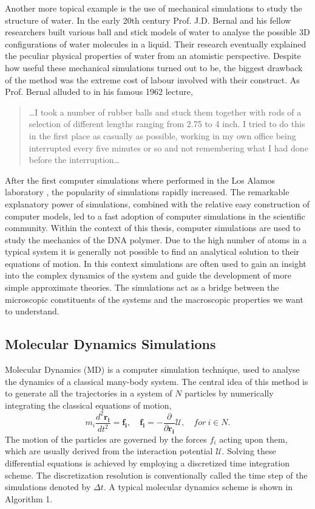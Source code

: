 Another more topical example is the use of mechanical simulations to study the
structure of water.  In the early 20th century Prof. J.D. Bernal and his fellow
researchers built various ball and stick models of water to analyse the possible 3D
configurations of water molecules in a liquid.\cite{Finney_2007} Their research
eventually explained the peculiar physical properties of water from an atomistic
perspective. Despite how useful these mechanical simulations turned out to be, the
biggest drawback of the method was the extreme cost of labour involved with their
construct. As Prof. Bernal alluded to in his famous 1962 lecture,

\begin{quote}
\dots I took a number of rubber balls and stuck them together with rods of a
selection of different lengths ranging from 2.75 to 4 inch. I tried to do this in the
first place as casually as possible, working in my own office being interrupted every
five minutes or so and not remembering what I had done before the interruption\dots
\cite{Bernal1962}
\end{quote}

After the first computer simulations where performed in the Los Alamos laboratory
\cite{Metropolis1953}, the
popularity of simulations rapidly increased. The remarkable explanatory power of
simulations, combined with the relative easy construction of computer models, led to a
fast adoption of computer simulations in the scientific community. Within the context of
this thesis, computer simulations are used to study the mechanics of
the DNA polymer. Due to the high number of atoms in a typical system it is generally
not possible to find an analytical solution to their equations of motion. In this
context simulations are often used to gain an insight into the complex dynamics of the
system and guide the development of more simple approximate theories. The simulations
act as a bridge between the microscopic constituents of the systems and the macroscopic
properties we want to understand.

\subsection{Molecular Dynamics Simulations}
Molecular Dynamics (MD) is a computer simulation technique, used to
analyse the dynamics of a classical many-body system.\cite{Frenkel2001} The central idea
of this method is to generate all the trajectories in a system of $N$ particles by
numerically integrating the classical equations of motion,
\[
m_i \frac{d^2 \boldsymbol{r_i}}{dt^2} = \boldsymbol{f_i}, \quad \boldsymbol{f_i} = -
    \frac{\partial}{\partial \boldsymbol{r_i}} \mathcal{U}, \quad for\ i \in N.
\]
The motion of the particles are governed by the forces $f_i$ acting upon them, which are
usually derived from the interaction potential $\mathcal{U}$.
Solving these differential equations is achieved by employing a discretized time
integration scheme. The discretization resolution is conventionally called the time step
of the simulations denoted by $\Delta t$. A typical molecular dynamics scheme is shown in
Algorithm 1.

